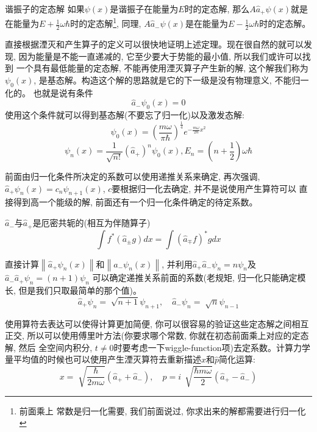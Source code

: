 \documentclass[a4paper,zihao=-4,linespread=1]{ctexrep}
\newenvironment{lequation}{\large\begin{equation}}{\end{equation}}
\begin{document}
    \begin{theorem}{谐振子的定态解}
        如果$\psi(x)$是谐振子在能量为$E$时的定态解, 那么$A\hat{a}_+\psi(x)$就是在能量为$E+\frac{1}{2}\omega\hbar$时的定态解\footnote[1]{前面乘上
        常数是归一化需要, 我们前面说过, 你求出来的解都需要进行归一化}, 同理, $A\hat{a}_-\psi(x)$是在能量为$E-\frac{1}{2}\omega\hbar$时的定态解。
    \end{theorem}
    直接根据湮灭和产生算子的定义可以很快地证明上述定理。现在很自然的就可以发现, 因为能量是不能一直递减的, 它至少要大于势能的最小值, 所以我们或许可以找到
    一个具有最低能量的定态解, 不能再使用湮灭算子产生新的解, 这个解我们称为$\psi_0(x)$, 是基态解。构造这个解的思路就是它的下一级是没有物理意义, 不能归一化的。
    也就是说有条件$$\hat{a}_-\psi_0(x)=0$$使用这个条件就可以得到基态解(不要忘了归一化)以及激发态解:
    \begin{lequation}
        \boxed{
            \psi_0(x)=\left(\frac{m\omega}{\pi\hbar}\right)^{\frac{1}{4}}e^{-\frac{m \omega}{2\hbar}x^2}
        }
    \end{lequation}
    \begin{lequation}
        \boxed{
            \psi_n(x)=\frac{1}{\sqrt{n!}}\left(\hat{a}_+\right)^n\psi_0(x),E_n=\left(n+\frac{1}{2}\right)\omega \hbar
        }
    \end{lequation}

    前面由归一化条件所决定的系数可以使用递推关系来确定, 再次强调, $\hat{a}_+\psi_n(x)=c_n\psi_{n+1}(x)$, $c$要根据归一化去确定, 并不是说使用产生算符可以
    直接得到高一个能级的解, 前面还有一个归一化条件确定的待定系数。
    \begin{theorem}{$\hat{a}_-$与$\hat{a}_+$是厄密共轭的(相互为伴随算子)}
        \begin{lequation}
            \int f^*(\hat{a}_\pm g)dx=\int (\hat{a}_\mp f)^* gdx
        \end{lequation}
    \end{theorem}
    直接计算$\left \| \hat{a}_+\psi_n(x) \right \|$和$\left \| \hat{a}_-\psi_n(x) \right \|$, 并利用$\hat{a}_+\hat{a}_-\psi_n=n\psi_n$及$\hat{a}_-\hat{a}_+\psi_n=(n+1)\psi_n$
    可以确定递推关系前面的系数(老规矩, 归一化只能确定模长, 但是我们只取最简单的那个值)。
    \begin{lequation}
        \boxed{
            \hat{a}_+\psi_n=\sqrt[]{n+1}\psi_{n+1},\quad\hat{a}_-\psi_n=\sqrt[]{n}\psi_{n-1}
        }
    \end{lequation}

    使用算符去表达可以使得计算更加简便, 你可以很容易的验证这些定态解之间相互正交, 所以可以使用傅里叶方法(你要求哪个常数, 你就在初态前面乘上对应的定态解, 然后
    全空间内积分, $t\neq0$时要考虑一下wiggle-function项)去定系数。计算力学量平均值的时候也可以使用产生湮灭算符去重新描述$x$和$\hat{p}$简化运算:
    \begin{lequation}
        \boxed{
            x =\sqrt[]{\frac{\hbar}{2m\omega}}\left(\hat{a}_++\hat{a}_-\right), \quad 
            p =i\,\sqrt[]{\frac{\hbar m \omega}{2}}\left(\hat{a}_+-\hat{a}_-\right)
        }
    \end{lequation}
\end{document}
